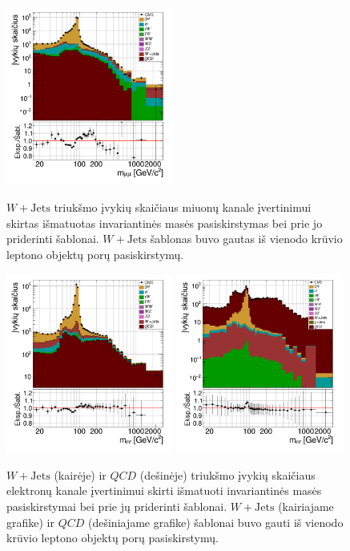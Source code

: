 \documentclass[a4paper, 12pt, oneside]{article}
\newcommand{\WJets}{W\! +\!\mathrm{Jets}}
\newcommand{\QCD}{QC\! D}
\begin{document}
\begin{figure}[b!]
	\RawFloats\centering
	\includegraphics[width=0.49\textwidth]{Magistrinis/WJETmu_fit.png}
	\caption{\label{fig:MassmumuFit}
		$\WJets$ triukšmo įvykių skaičiaus miuonų kanale įvertinimui skirtas išmatuotas invariantinės masės pasiskirstymas bei prie
		jo priderinti šablonai.
		$\WJets$ šablonas buvo gautas iš vienodo krūvio leptono objektų porų pasiskirstymų.}
\vspace{1cm}
	\includegraphics[width=0.49\textwidth]{Magistrinis/WJETe_fit.png}
	\includegraphics[width=0.49\textwidth]{Magistrinis/QCDe_fit.png}
	\caption{\label{fig:MasseeFit}
		$\WJets$ (kairėje) ir $\QCD$ (dešinėje) triukšmo įvykių skaičiaus elektronų kanale įvertinimui skirti išmatuoti invariantinės
		masės pasiskirstymai bei prie jų priderinti šablonai.
		$\WJets$ (kairiajame grafike) ir $\QCD$ (dešiniajame grafike) šablonai buvo gauti iš vienodo krūvio leptono objektų porų pasiskirstymų.}
\end{figure}
\end{document}
